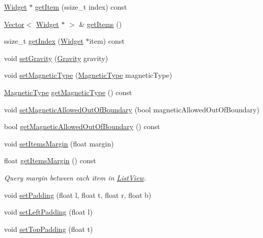 \begin{DoxyCompactItemize}
\hyperlink{classui_1_1Widget}{Widget} $\ast$ \hyperlink{classui_1_1ListView_ae28dcb453c3cd18850e4f34975ca64b0}{get\+Item} (ssize\+\_\+t index) const
\item 
\hyperlink{classVector}{Vector}$<$ \hyperlink{classui_1_1Widget}{Widget} $\ast$ $>$ \& \hyperlink{classui_1_1ListView_a4b746fb73635a3b5302fc3493d7eb725}{get\+Items} ()
\item 
ssize\+\_\+t \hyperlink{classui_1_1ListView_a4f0306a68670aba071042347db7fe21e}{get\+Index} (\hyperlink{classui_1_1Widget}{Widget} $\ast$item) const
\item 
void \hyperlink{classui_1_1ListView_ae65016cdf079cded10de1db27fff4be9}{set\+Gravity} (\hyperlink{classui_1_1ListView_af79b44631b38c1782c384830acf20cf6}{Gravity} gravity)
\item 
void \hyperlink{classui_1_1ListView_ab94e44098f2d082aaf5dab97a4a02f61}{set\+Magnetic\+Type} (\hyperlink{classui_1_1ListView_a143593e762b785241572552b060aed6f}{Magnetic\+Type} magnetic\+Type)
\item 
\hyperlink{classui_1_1ListView_a143593e762b785241572552b060aed6f}{Magnetic\+Type} \hyperlink{classui_1_1ListView_ab5b6b09f66fbdd931364ee64022edec7}{get\+Magnetic\+Type} () const
\item 
void \hyperlink{classui_1_1ListView_a0869253d15f9257c5313c5b156bc5ba5}{set\+Magnetic\+Allowed\+Out\+Of\+Boundary} (bool magnetic\+Allowed\+Out\+Of\+Boundary)
\item 
bool \hyperlink{classui_1_1ListView_acfed7db635b37551e6a1429b54dd8178}{get\+Magnetic\+Allowed\+Out\+Of\+Boundary} () const
\item 
void \hyperlink{classui_1_1ListView_a945511bd4d4c08d528bd1cf50dbedb35}{set\+Items\+Margin} (float margin)
\item 
float \hyperlink{classui_1_1ListView_a1b035dc59aabb5c9addcef3e16917900}{get\+Items\+Margin} () const
\begin{DoxyCompactList}\small\item\em Query margin between each item in \hyperlink{classui_1_1ListView}{List\+View}. \end{DoxyCompactList}\item 
void \hyperlink{classui_1_1ListView_af258cfedf835f3dce4d180d0df3fa888}{set\+Padding} (float l, float t, float r, float b)
\item 
void \hyperlink{classui_1_1ListView_a3ea5e926f73d1ed517d3e49c8acc53f2}{set\+Left\+Padding} (float l)
\item 
void \hyperlink{classui_1_1ListView_aeb8a524c2ba33a74b77267b7815bd949}{set\+Top\+Padding} (float t)

\end{DoxyCompactItemize}
